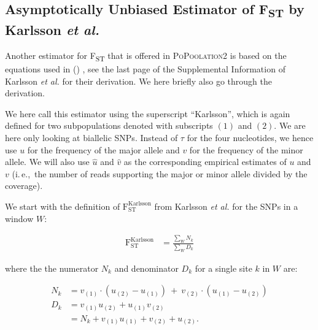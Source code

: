 \documentclass[a4paper,fontsize=9pt,DIV=14]{scrartcl}
\newcommand\citeay[1]{\citeauthor{#1} (\citeyear{#1}) \cite{#1}}
\newcommand\toolname{\textsc}
\newcommand{\fst}{F\textsubscript{ST}}
\newcommand{\ie}{i.\,e.,~}
\begin{document}

\subsection{Asymptotically Unbiased Estimator of \texorpdfstring{\fst}{FST} by Karlsson \textit{et al.}}
\label{supp:sec:FST:sub:Karlsson}

Another estimator for \fst{} that is offered in \toolname{PoPoolation2} is based on the equations used in \citeay{Karlsson2007}, see the last page of the Supplemental Information of Karlsson \textit{et al.} for their derivation.
We here briefly also go through the derivation.

We here call this estimator using the superscript ``Karlsson'', which is again defined for two subpopulations denoted with subscripts $(1)$ and $(2)$.
We are here only looking at biallelic SNPs.
Instead of $\tau$ for the four nucleotides, we hence use $u$ for the frequency of the major allele and $v$ for the frequency of the minor allele.  We will also use $\widehat{u}$ and $\widehat{v}$ as the corresponding empirical estimates of $u$ and $v$ (\ie the number of reads supporting the major or minor allele divided by the coverage).

We start with the definition of $\text{F}_\text{ST}^\text{Karlsson}$ from Karlsson \textit{et al.} for the SNPs in a window $W$:

\begin{align}
    \label{eq:FstK}
    \text{F}_\text{ST}^\text{Karlsson} &= \frac{\sum_W N_k}{\sum_W D_k}
\end{align}

where the the numerator $N_k$ and denominator $D_k$ for a single site $k$ in $W$ are:

\begin{align}
    \label{eq:FstNk}
    N_k &= v_{(1)} \cdot ( u_{(2)} - u_{(1)} ) ~+~ v_{(2)} \cdot ( u_{(1)} - u_{(2)} ) \\
    \label{eq:FstDk}
    \nonumber
    D_k &= v_{(1)} u_{(2)} + u_{(1)} v_{(2)} \\
        &= N_k + v_{(1)} u_{(1)} + v_{(2)} + u_{(2)}.
\end{align}
\end{document}
